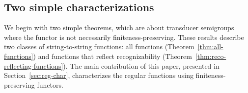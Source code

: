 




\subsection{Two simple characterizations}
\label{sec:two-simple}
We begin with two simple theorems, which are about transducer semigroups where the functor is not necessarily finiteness-preserving. These results describe two classes of string-to-string functions: all functions (Theorem~\ref{thm:all-functions}) and functions that reflect recognizability (Theorem~\ref{thm:reco-reflecting-functions}).
The main contribution of this paper, presented in Section~\ref{sec:reg-char}, characterizes the regular functions using  finiteness-preserving functors.

